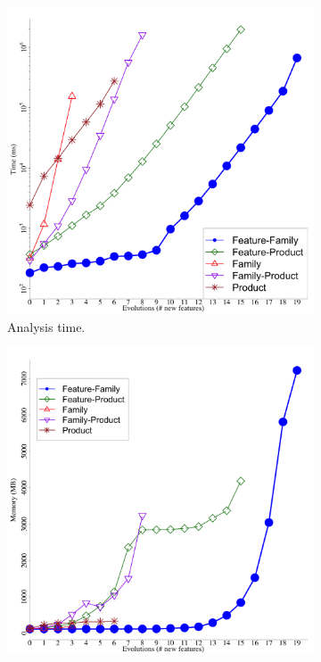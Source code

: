 \begin{figure}[p]
  \begin{subfigure}[t]{0.5\columnwidth}
    \centering
    \includegraphics[width=1.0\columnwidth]{img/logemailTime}
    \caption{Analysis time.}
    \label{fig:email-analysisTime}
  \end{subfigure}
  \begin{subfigure}[t]{0.5\columnwidth}
    \centering
    \includegraphics[width=1.0\columnwidth]{img/emailSpace}

\end{subfigure}
\end{figure}

